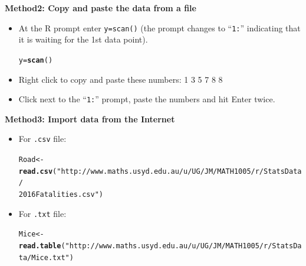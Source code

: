 \documentclass[bigtut]{tutorial}\usepackage[]{graphicx}\usepackage[]{color}
\makeatletter
\newcommand{\hlstr}[1]{\textcolor[rgb]{0.192,0.494,0.8}{#1}}%
\newcommand{\hlstd}[1]{\textcolor[rgb]{0.345,0.345,0.345}{#1}}%
\newcommand{\hlkwb}[1]{\textcolor[rgb]{0.69,0.353,0.396}{#1}}%
\newcommand{\hlkwd}[1]{\textcolor[rgb]{0.737,0.353,0.396}{\textbf{#1}}}%
\newenvironment{kframe}{%
 \def\at@end@of@kframe{}%
 \ifinner\ifhmode%
  \def\at@end@of@kframe{\end{minipage}}%
  \begin{minipage}{\columnwidth}%
 \fi\fi%
 \def\FrameCommand##1{\hskip\@totalleftmargin \hskip-\fboxsep
 \colorbox{shadecolor}{##1}\hskip-\fboxsep
     \hskip-\linewidth \hskip-\@totalleftmargin \hskip\columnwidth}%
 \MakeFramed {\advance\hsize-\width
   \@totalleftmargin\z@ \linewidth\hsize
   \@setminipage}}%
 {\par\unskip\endMakeFramed%
 \at@end@of@kframe}
\newenvironment{knitrout}{}{} %
\makeatother
\begin{document}
\begin{tutorial}
\begin{questions}
\vspace{1cm}
{\bf Method2: Copy and paste the data from a file}

\begin{itemize}
\item At the R prompt enter  \texttt{y=scan()} (the prompt changes to ``\texttt{1:}'' indicating that it is waiting for the 1st data point).
\begin{knitrout}
\color{fgcolor}\begin{kframe}
\begin{alltt}
\hlstd{y}\hlkwb{=}\hlkwd{scan}\hlstd{()}
\end{alltt}
\end{kframe}
\end{knitrout}

\vspace{.5cm}
\item Right click to copy and paste these numbers: 1 3 5 7 8 8 

\vspace{.5cm}
\item Click next to the ``\texttt{1:}'' prompt, paste the numbers and hit \textsf{Enter} twice.
\end{itemize}


\vspace{1cm}
{\bf Method3: Import data from the Internet} 

\begin{itemize}
\item
For \texttt{.csv} file: 
\begin{knitrout}
\color{fgcolor}\begin{kframe}
\begin{alltt}
\hlstd{Road} \hlkwb{<-} \hlkwd{read.csv}\hlstd{(}\hlstr{"http://www.maths.usyd.edu.au/u/UG/JM/MATH1005/r/StatsData/
                 2016Fatalities.csv"}\hlstd{)}
\end{alltt}
\end{kframe}
\end{knitrout}

\vspace{.5cm}
\item
For \texttt{.txt} file: 
\begin{knitrout}
\color{fgcolor}\begin{kframe}
\begin{alltt}
\hlstd{Mice} \hlkwb{<-} \hlkwd{read.table}\hlstd{(}\hlstr{"http://www.maths.usyd.edu.au/u/UG/JM/MATH1005/r/StatsData/Mice.txt"}\hlstd{)}
\end{alltt}
\end{kframe}
\end{knitrout}


\end{itemize}
\end{questions}
\end{tutorial}
\end{document}
